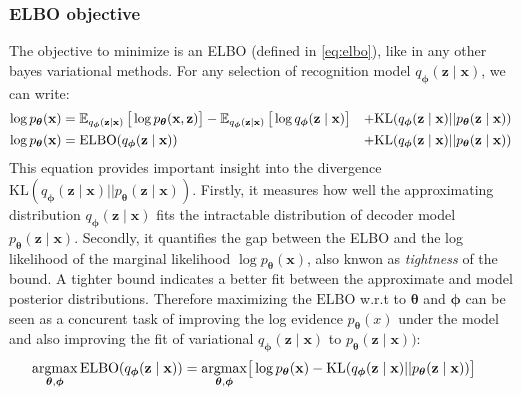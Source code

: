 \subsubsection{ELBO objective}
The objective to minimize is an ELBO (defined in \ref{eq:elbo}), like in any other bayes variational methods. For any selection of recognition model $q_{\boldsymbol{\phi}}(\mathbf{z}\mid \mathbf{x})$,
we can write:
\begin{align}
    \label{eq:vae}
    \log p_{\boldsymbol{\theta}}(\mathbf{x})  &= \operatorname{\mathbb{E}}_{q_{\boldsymbol{\phi}}(\mathbf{z}\mid \mathbf{x})} \big[\log p_{\boldsymbol{\theta}}(\mathbf{x},\mathbf{z})\big] - \operatorname{\mathbb{E}}_{q_{\boldsymbol{\phi}}(\mathbf{z}\mid \mathbf{x})} \big[\log q_{\boldsymbol{\phi}}(\mathbf{z}\mid \mathbf{x})\big] &+ \mathrm{KL}(q_{\boldsymbol{\phi}}(\mathbf{z}\mid \mathbf{x}) || p_{\boldsymbol{\theta}}(\mathbf{z} \mid  \mathbf{x})) \\
    \log p_{\boldsymbol{\theta}}(\mathbf{x})  &= \mathrm{ELBO}(q_{\boldsymbol{\phi}}(\mathbf{z}\mid \mathbf{x})) &+ \mathrm{KL}(q_{\boldsymbol{\phi}}(\mathbf{z}\mid \mathbf{x}) || p_{\boldsymbol{\theta}}(\mathbf{z} \mid  \mathbf{x}))
\end{align}
This equation provides important insight into the divergence $\mathrm{KL}(q_{\boldsymbol{\phi}}(\mathbf{z}\mid \mathbf{x}) || p_{\boldsymbol{\theta}}(\mathbf{z} \mid  \mathbf{x}))$. 
Firstly, it measures how well the approximating distribution $q_{\boldsymbol{\phi}}(\mathbf{z}\mid \mathbf{x})$ fits the intractable distribution of decoder 
model $p_{\boldsymbol{\theta}}(\mathbf{z} \mid  \mathbf{x})$. Secondly, it quantifies the gap between the ELBO and the log likelihood of the marginal likelihood 
$\log p_{\boldsymbol{\theta}}(\mathbf{x})$, also knwon as \textit{tightness} of the bound. A tighter bound indicates a better fit between the approximate 
and model posterior distributions. Therefore maximizing the $\mathrm{ELBO}$ w.r.t to ${\boldsymbol{\theta}}$ and ${\boldsymbol{\phi}}$ can be seen as a concurent task of 
improving the log evidence $p_{\boldsymbol{\theta}}(x)$ under the model and also improving the fit of variational $q_{\boldsymbol{\phi}}(\mathbf{z}\mid \mathbf{x})$ to 
$p_{\boldsymbol{\theta}}(\mathbf{z} \mid  \mathbf{x}))$:
\begin{align}
    \label{eq:opt_vae}
    \mathop{\rm argmax}_{{\boldsymbol{\theta}},{\boldsymbol{\phi}}} \mathrm{ELBO}(q_{\boldsymbol{\phi}}(\mathbf{z}\mid \mathbf{x})) &= \mathop{\rm argmax}_{{\boldsymbol{\theta}},{\boldsymbol{\phi}}} \bigr[ \log p_{\boldsymbol{\theta}}(\mathbf{x}) - \mathrm{KL}(q_{\boldsymbol{\phi}}(\mathbf{z}\mid \mathbf{x}) || p_{\boldsymbol{\theta}}(\mathbf{z} \mid  \mathbf{x})) \bigl] 
\end{align}
